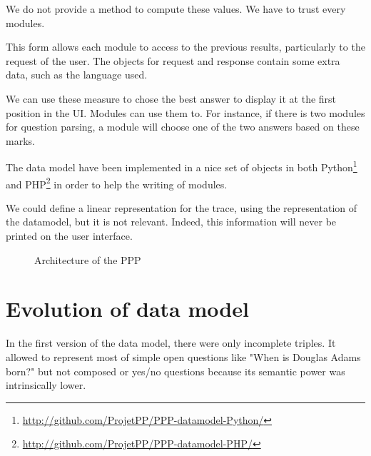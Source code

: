 We do not provide a method to compute these values. We have to trust every modules.

This form allows each module to access to the previous results, particularly to the request of the user. The objects for request and response contain some extra data, such as the language used.

We can use these measure to chose the best answer to display it at the first position in the UI. Modules can use them to. For instance, if there is two modules for question parsing, a module will choose one of the two answers based on these marks.

The data model have been implemented in a nice set of objects in both Python\footnote{\url{http://github.com/ProjetPP/PPP-datamodel-Python/}} and PHP\footnote{\url{http://github.com/ProjetPP/PPP-datamodel-PHP/}} in order to help the writing of modules.

We could define a linear representation for the trace, using the representation of the datamodel, but it is not relevant. Indeed, this information will never be printed on the user interface.

\begin{figure}[!ht]
    \centering
    \label{datamodel:struct}
    
    \caption{Architecture of the PPP}
\end{figure}

\FloatBarrier

\section{Evolution of data model}

In the first version of the data model, there were only incomplete triples. It allowed to represent most of simple open questions like "When is Douglas Adams born?" but not composed or yes/no questions because its semantic power was intrinsically lower.
